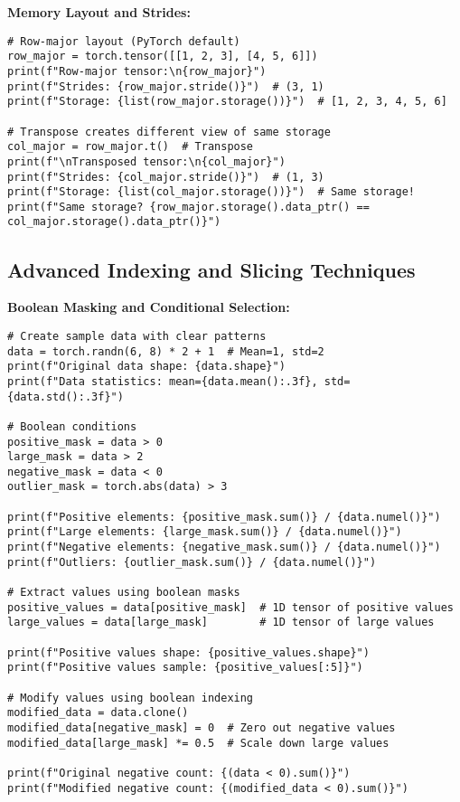 \documentclass[11pt,a4paper]{book}
\begin{document}
\textbf{Memory Layout and Strides:}
\begin{verbatim}
# Row-major layout (PyTorch default)
row_major = torch.tensor([[1, 2, 3], [4, 5, 6]])
print(f"Row-major tensor:\n{row_major}")
print(f"Strides: {row_major.stride()}")  # (3, 1)
print(f"Storage: {list(row_major.storage())}")  # [1, 2, 3, 4, 5, 6]

# Transpose creates different view of same storage
col_major = row_major.t()  # Transpose
print(f"\nTransposed tensor:\n{col_major}")
print(f"Strides: {col_major.stride()}")  # (1, 3)
print(f"Storage: {list(col_major.storage())}")  # Same storage!
print(f"Same storage? {row_major.storage().data_ptr() == col_major.storage().data_ptr()}")
\end{verbatim}

\subsection{Advanced Indexing and Slicing Techniques}

\textbf{Boolean Masking and Conditional Selection:}
\begin{verbatim}
# Create sample data with clear patterns
data = torch.randn(6, 8) * 2 + 1  # Mean=1, std=2
print(f"Original data shape: {data.shape}")
print(f"Data statistics: mean={data.mean():.3f}, std={data.std():.3f}")

# Boolean conditions
positive_mask = data > 0
large_mask = data > 2
negative_mask = data < 0
outlier_mask = torch.abs(data) > 3

print(f"Positive elements: {positive_mask.sum()} / {data.numel()}")
print(f"Large elements: {large_mask.sum()} / {data.numel()}")
print(f"Negative elements: {negative_mask.sum()} / {data.numel()}")
print(f"Outliers: {outlier_mask.sum()} / {data.numel()}")

# Extract values using boolean masks
positive_values = data[positive_mask]  # 1D tensor of positive values
large_values = data[large_mask]        # 1D tensor of large values

print(f"Positive values shape: {positive_values.shape}")
print(f"Positive values sample: {positive_values[:5]}")

# Modify values using boolean indexing
modified_data = data.clone()
modified_data[negative_mask] = 0  # Zero out negative values
modified_data[large_mask] *= 0.5  # Scale down large values

print(f"Original negative count: {(data < 0).sum()}")
print(f"Modified negative count: {(modified_data < 0).sum()}")
\end{verbatim}
\end{document}
